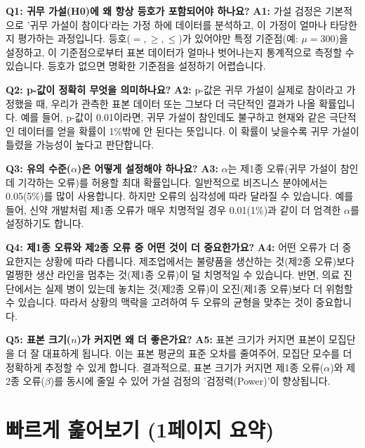 \documentclass[11pt,a4paper]{article}
\begin{document}
\textbf{Q1: 귀무 가설(H0)에 왜 항상 등호가 포함되어야 하나요?}
\textbf{A1:} 가설 검정은 기본적으로 '귀무 가설이 참이다'라는 가정 하에 데이터를 분석하고, 이 가정이 얼마나 타당한지 평가하는 과정입니다. 등호($=, \ge, \le$)가 있어야만 특정 기준점(예: $\mu=300$)을 설정하고, 이 기준점으로부터 표본 데이터가 얼마나 벗어나는지 통계적으로 측정할 수 있습니다. 등호가 없으면 명확한 기준점을 설정하기 어렵습니다.

\textbf{Q2: p-값이 정확히 무엇을 의미하나요?}
\textbf{A2:} p-값은 귀무 가설이 실제로 참이라고 가정했을 때, 우리가 관측한 표본 데이터 또는 그보다 더 극단적인 결과가 나올 확률입니다. 예를 들어, p-값이 0.01이라면, 귀무 가설이 참인데도 불구하고 현재와 같은 극단적인 데이터를 얻을 확률이 1\%밖에 안 된다는 뜻입니다. 이 확률이 낮을수록 귀무 가설이 틀렸을 가능성이 높다고 판단합니다.

\textbf{Q3: 유의 수준($\alpha$)은 어떻게 설정해야 하나요?}
\textbf{A3:} $\alpha$는 제1종 오류(귀무 가설이 참인데 기각하는 오류)를 허용할 최대 확률입니다. 일반적으로 비즈니스 분야에서는 0.05(5\%)를 많이 사용합니다. 하지만 오류의 심각성에 따라 달라질 수 있습니다. 예를 들어, 신약 개발처럼 제1종 오류가 매우 치명적일 경우 0.01(1\%)과 같이 더 엄격한 $\alpha$를 설정하기도 합니다.

\textbf{Q4: 제1종 오류와 제2종 오류 중 어떤 것이 더 중요한가요?}
\textbf{A4:} 어떤 오류가 더 중요한지는 상황에 따라 다릅니다. 제조업에서는 불량품을 생산하는 것(제2종 오류)보다 멀쩡한 생산 라인을 멈추는 것(제1종 오류)이 덜 치명적일 수 있습니다. 반면, 의료 진단에서는 실제 병이 있는데 놓치는 것(제2종 오류)이 오진(제1종 오류)보다 더 위험할 수 있습니다. 따라서 상황의 맥락을 고려하여 두 오류의 균형을 맞추는 것이 중요합니다.

\textbf{Q5: 표본 크기($n$)가 커지면 왜 더 좋은가요?}
\textbf{A5:} 표본 크기가 커지면 표본이 모집단을 더 잘 대표하게 됩니다. 이는 표본 평균의 표준 오차를 줄여주어, 모집단 모수를 더 정확하게 추정할 수 있게 합니다. 결과적으로, 표본 크기가 커지면 제1종 오류($\alpha$)와 제2종 오류($\beta$)를 동시에 줄일 수 있어 가설 검정의 '검정력(Power)'이 향상됩니다.

\newpage
\section*{빠르게 훑어보기 (1페이지 요약)}
\end{document}

